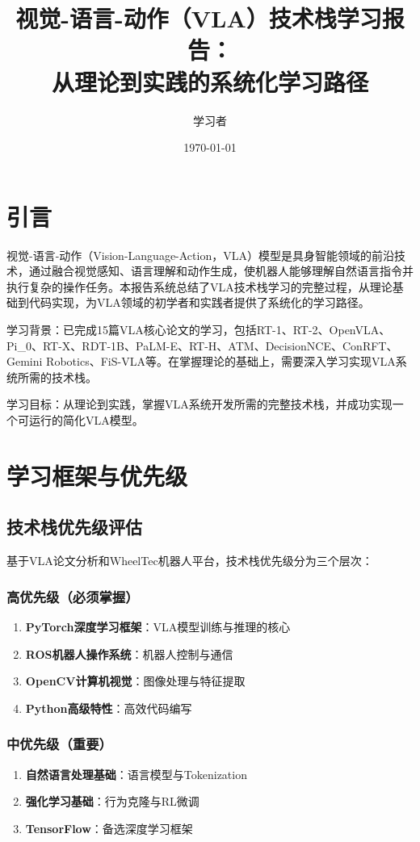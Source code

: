 \documentclass[12pt,a4paper]{article}
\title{\textbf{视觉-语言-动作（VLA）技术栈学习报告：\\从理论到实践的系统化学习路径}}
\author{学习者}
\date{\today}
\begin{document}
\maketitle

\tableofcontents

\section{引言}

视觉-语言-动作（Vision-Language-Action，VLA）模型是具身智能领域的前沿技术，通过融合视觉感知、语言理解和动作生成，使机器人能够理解自然语言指令并执行复杂的操作任务。本报告系统总结了VLA技术栈学习的完整过程，从理论基础到代码实现，为VLA领域的初学者和实践者提供了系统化的学习路径。

学习背景：已完成15篇VLA核心论文的学习，包括RT-1、RT-2、OpenVLA、Pi\_0、RT-X、RDT-1B、PaLM-E、RT-H、ATM、DecisionNCE、ConRFT、Gemini Robotics、FiS-VLA等。在掌握理论的基础上，需要深入学习实现VLA系统所需的技术栈。

学习目标：从理论到实践，掌握VLA系统开发所需的完整技术栈，并成功实现一个可运行的简化VLA模型。

\section{学习框架与优先级}

\subsection{技术栈优先级评估}

基于VLA论文分析和WheelTec机器人平台，技术栈优先级分为三个层次：

\subsubsection{高优先级（必须掌握）}
\begin{enumerate}
    \item \textbf{PyTorch深度学习框架}：VLA模型训练与推理的核心
    \item \textbf{ROS机器人操作系统}：机器人控制与通信
    \item \textbf{OpenCV计算机视觉}：图像处理与特征提取
    \item \textbf{Python高级特性}：高效代码编写
\end{enumerate}

\subsubsection{中优先级（重要）}
\begin{enumerate}
    \item \textbf{自然语言处理基础}：语言模型与Tokenization
    \item \textbf{强化学习基础}：行为克隆与RL微调
    \item \textbf{TensorFlow}：备选深度学习框架
\end{enumerate}
\end{document}
